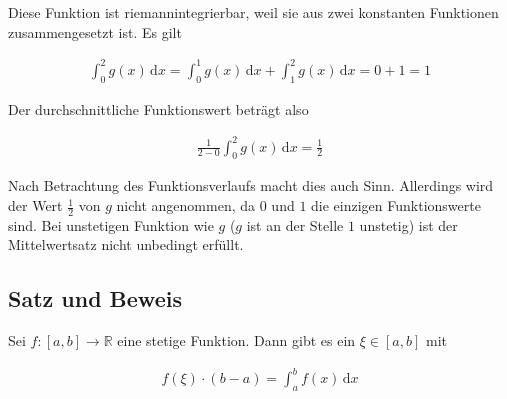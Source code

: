 \documentclass[fontsize=9pt,
               parskip=half-,
               DIV=14,
               listof=chapterentry,
               tocflat]{scrbook}
\begin{document}
Diese Funktion ist riemannintegrierbar, weil sie aus zwei konstanten Funktionen zusammengesetzt ist. Es gilt

\begin{align*}
\int _{0}^{2}g(x)\,\mathrm {d} x=\int _{0}^{1}g(x)\,\mathrm {d} x+\int _{1}^{2}g(x)\,\mathrm {d} x=0+1=1
\end{align*}

Der durchschnittliche Funktionswert beträgt also

\begin{align*}
{\frac {1}{2-0}}\int _{0}^{2}g(x)\,\mathrm {d} x={\frac {1}{2}}
\end{align*}

Nach Betrachtung des Funktionsverlaufs macht dies auch Sinn. Allerdings wird der Wert ${\tfrac {1}{2}}$ von $g$ nicht angenommen, da $0$ und $1$ die einzigen Funktionswerte sind. Bei unstetigen Funktion wie $g$ ($g$ ist an der Stelle $1$ unstetig) ist der Mittelwertsatz nicht unbedingt erfüllt.
\clearpage
\subsection{Satz und Beweis}

\begin{theorem*}
Sei $f:[a,b]\to \mathbb {R} $ eine stetige Funktion. Dann gibt es ein $\xi \in [a,b]$ mit

\begin{align*}
f(\xi )\cdot (b-a)=\int _{a}^{b}f(x)\,\mathrm {d} x
\end{align*}

\end{theorem*}
\end{document}
